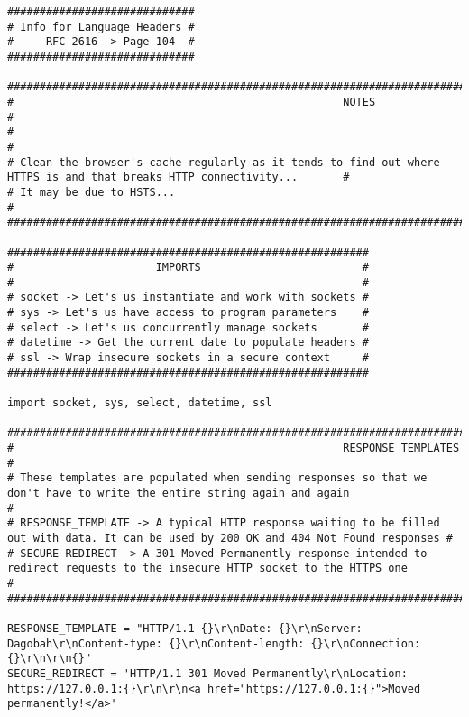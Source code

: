 \documentclass[landscape]{article}
\begin{document}
\begin{verbatim}
#############################
# Info for Language Headers #
#     RFC 2616 -> Page 104  #
#############################

#########################################################################################################################
#                                                   NOTES                                                               #
#                                                                                                                       #
# Clean the browser's cache regularly as it tends to find out where HTTPS is and that breaks HTTP connectivity...       #
# It may be due to HSTS...                                                                                              #
#########################################################################################################################

########################################################
#                      IMPORTS                         #
#                                                      #
# socket -> Let's us instantiate and work with sockets #
# sys -> Let's us have access to program parameters    #
# select -> Let's us concurrently manage sockets       #
# datetime -> Get the current date to populate headers #
# ssl -> Wrap insecure sockets in a secure context     #
########################################################

import socket, sys, select, datetime, ssl

#########################################################################################################################################
#                                                   RESPONSE TEMPLATES                                                                  #
# These templates are populated when sending responses so that we don't have to write the entire string again and again                 #
# RESPONSE_TEMPLATE -> A typical HTTP response waiting to be filled out with data. It can be used by 200 OK and 404 Not Found responses #
# SECURE REDIRECT -> A 301 Moved Permanently response intended to redirect requests to the insecure HTTP socket to the HTTPS one        #
#########################################################################################################################################

RESPONSE_TEMPLATE = "HTTP/1.1 {}\r\nDate: {}\r\nServer: Dagobah\r\nContent-type: {}\r\nContent-length: {}\r\nConnection: {}\r\n\r\n{}"
SECURE_REDIRECT = 'HTTP/1.1 301 Moved Permanently\r\nLocation: https://127.0.0.1:{}\r\n\r\n<a href="https://127.0.0.1:{}">Moved permanently!</a>'


\end{verbatim}
\end{document}

